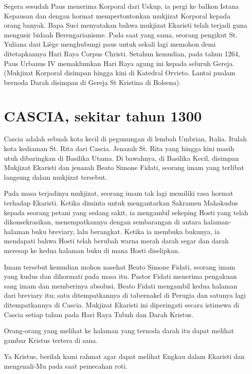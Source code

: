 Segera sesudah Paus menerima Korporal dari Uskup, ia pergi ke balkon Istana Kepausan dan dengan hormat mempertontonkan mukjizat Korporal kepada orang banyak. Bapa Suci menyatakan bahwa mukjizat Ekaristi telah terjadi guna mengusir bidaah Berengarianisme. Pada saat yang sama, seorang pengikut St. Yuliana dari Liège menghubungi paus untuk sekali lagi memohon demi ditetapkannya Hari Raya Corpus Christi. Setahun kemudian, pada tahun 1264, Paus Urbanus IV memaklumkan Hari Raya agung ini kepada seluruh Gereja. (Mukjizat Korporal disimpan hingga kini di Katedral Orvieto. Lantai pualam bernoda Darah disimpan di Gereja St Kristina di Bolsena).  

\section{CASCIA, sekitar tahun 1300}
Cascia adalah sebuah kota kecil di pegunungan di lembah Umbrian, Italia. Itulah kota kediaman St. Rita dari Cascia. Jenazah St. Rita yang hingga kini masih utuh dibaringkan di Basilika Utama. Di bawahnya, di Basilika Kecil, disimpan Mukjizat Ekaristi dan jenazah Beato Simone Fidati, seorang imam yang terlibat langsung dalam mukjizat tersebut.

Pada masa terjadinya mukjizat, seorang imam tak lagi memiliki rasa hormat terhadap Ekaristi. Ketika diminta untuk mengantarkan Sakramen Mahakudus kepada seorang petani yang sedang sakit, ia mengambil sekeping Hosti yang telah dikonsekrasikan, menempatkannya dengan sembarangan di antara halaman-halaman buku breviary, lalu berangkat. Ketika ia membuka bukunya, ia mendapati bahwa Hosti telah berubah warna merah darah segar dan darah meresap ke kedua halaman buku di mana Hosti diselipkan.

Imam tersebut kemudian mohon nasehat Beato Simone Fidati, seorang imam yang kudus dan dihormati pada masa itu. Pastor Fidati menerima pengakuan sang imam dan memberinya absolusi. Beato Fidati mengambil kedua halaman dari breviary itu; satu ditempatkannya di tabernakel di Perugia dan satunya lagi ditempatkannya di Cascia. Mukjizat Ekaristi ini diperingati secara istimewa di Cascia setiap tahun pada Hari Raya Tubuh dan Darah Kristus.

Orang-orang yang melihat ke halaman yang ternoda darah itu dapat melihat gambar Kristus tertera di sana.

Ya Kristus, berilah kami rahmat agar dapat melihat Engkau dalam Ekaristi dan mengenali-Mu pada saat pemecahan roti.

 

